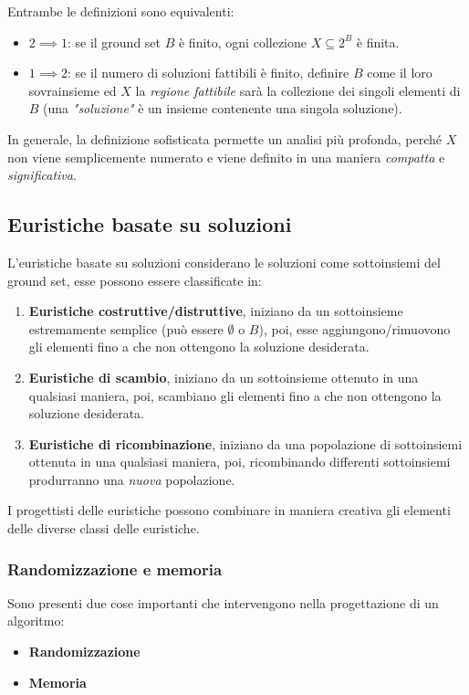 \documentclass{article}
\begin{document}
Entrambe le definizioni sono equivalenti:
\begin{itemize}
    \item $2 \implies 1$: se il ground set $B$ è finito, ogni collezione $X\subseteq 2^B$ è finita.
    \item $1 \implies 2$: se il numero di soluzioni fattibili è finito, definire $B$ come il loro sovrainsieme ed $X$ la \textit{regione fattibile} sarà la
          collezione dei singoli elementi di $B$ (una \textit{"soluzione"} è un insieme contenente una singola soluzione).
\end{itemize}
In generale, la definizione sofisticata permette un analisi più profonda, perché $X$ non viene semplicemente numerato
e viene definito in una maniera \textit{compatta} e \textit{significativa}.

\subsection{Euristiche basate su soluzioni}
L'euristiche basate su soluzioni considerano le soluzioni come sottoinsiemi del ground set, esse possono essere classificate in:
\begin{enumerate}
    \item \textbf{Euristiche costruttive/distruttive}, iniziano da un sottoinsieme estremamente semplice
          (può essere $\emptyset$ o $B$), poi, esse aggiungono/rimuovono gli elementi fino a che non ottengono la soluzione desiderata.
    \item \textbf{Euristiche di scambio}, iniziano da un sottoinsieme ottenuto in una qualsiasi maniera,
          poi, scambiano gli elementi fino a che non ottengono la soluzione desiderata.
    \item \textbf{Euristiche di ricombinazione}, iniziano da una popolazione di sottoinsiemi ottenuta in una qualsiasi maniera,
          poi, ricombinando differenti sottoinsiemi produrranno una \textit{nuova} popolazione.
\end{enumerate}

I progettisti delle euristiche possono combinare in maniera creativa gli elementi delle diverse classi delle euristiche.

\subsubsection{Randomizzazione e memoria}
Sono presenti due cose importanti che intervengono nella progettazione di un algoritmo:
\begin{itemize}
    \item \textbf{Randomizzazione}
    \item \textbf{Memoria}
\end{itemize}
\end{document}
